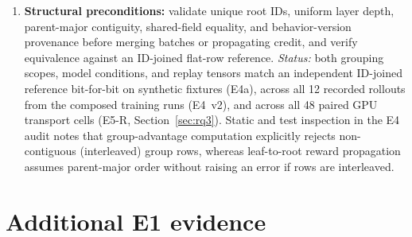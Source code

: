 \documentclass[10pt]{article}
\begin{document}
\begin{enumerate}
  \item \textbf{Structural preconditions:} validate unique root IDs, uniform layer depth, parent-major contiguity, shared-field equality, and behavior-version provenance before merging batches or propagating credit, and verify equivalence against an ID-joined flat-row reference.
  \emph{Status:} both grouping scopes, model conditions, and replay tensors match an independent ID-joined reference bit-for-bit on synthetic fixtures (E4a), across all 12 recorded rollouts from the composed training runs (E4~v2), and across all 48 paired GPU transport cells (E5-R, Section~\ref{sec:rq3}). Static and test inspection in the E4 audit notes that group-advantage computation explicitly rejects non-contiguous (interleaved) group rows, whereas leaf-to-root reward propagation assumes parent-major order without raising an error if rows are interleaved.
\end{enumerate}

\begin{table}[H]
\caption{E0 rollout--replay parity on smoke runs: absolute difference between rollout-engine and train-side replay log probabilities before the first optimizer update and after one weight publication. Each cell represents a single smoke check. \texttt{CheckpointWeightSync} is unsupported by the \texttt{vllm\_omni} receiver used in that row, so only its pre-update check is recorded; the in-process \texttt{train\_engine} rollout mode shares model weights directly and therefore performs no weight publication. No formal acceptance tolerance has been set.}
\label{tab:parity-smoke}
\centering
\scriptsize

\end{table}

\begin{table}[H]
\caption{Rollout--replay parity after every weight publication in the six formal E1 runs (800 rollouts each) and the seed 11 rerun (\EOneRerunEnd{} rollouts), all with \texttt{TensorWeightSync} to SGLang on 32 GPUs. For each rollout the gauge records the mean and the maximum absolute log-probability difference over tokens; the table gives the median, 95th percentile, and largest value of each over a run's rollouts. No acceptance tolerance has been set.}
\label{tab:parity-e1}
\centering
\small

\end{table}

\section{Additional E1 evidence}
\label{app:e1}
\end{document}
